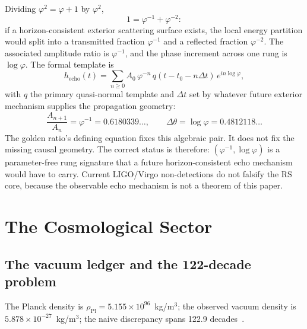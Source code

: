 \documentclass[11pt,letterpaper]{article}
\theoremstyle{definition}
\newcommand{\phiG}{\varphi}
\newcommand{\Pl}{\mathrm{Pl}}
\begin{document}
Dividing $\phiG^2=\phiG+1$ by $\phiG^2$,
\begin{equation}\label{eq:partition}
1=\phiG^{-1}+\phiG^{-2}:
\end{equation}
if a horizon-consistent exterior scattering surface exists, the local
energy partition would split into a transmitted fraction $\phiG^{-1}$
and a reflected fraction $\phiG^{-2}$.  The associated amplitude ratio
is $\phiG^{-1}$, and the phase increment across one rung is
$\log\phiG$.  The formal template is
\begin{equation}\label{eq:echo}
h_{\mathrm{echo}}(t)=\sum_{n\ge0}A_0\,\phiG^{-n}\,
q(t-t_0-n\Delta t)\,e^{in\log\phiG},
\end{equation}
with $q$ the primary quasi-normal template and $\Delta t$ set by whatever
future exterior mechanism supplies the propagation geometry:
\begin{equation}
\frac{A_{n+1}}{A_n}=\phiG^{-1}=0.6180339\ldots,
\qquad
\Delta\theta=\log\phiG=0.4812118\ldots
\end{equation}
The golden ratio's defining equation fixes this algebraic pair.  It
does not fix the missing causal geometry.  The correct status is
therefore: $(\phiG^{-1},\log\phiG)$ is a parameter-free rung signature
that a future horizon-consistent echo mechanism would have to carry.
Current LIGO/Virgo non-detections do not falsify the RS core, because
the observable echo mechanism is not a theorem of this paper.

\section{The Cosmological Sector}
\label{sec:cosmo}

\subsection{The vacuum ledger and the 122-decade problem}
\label{sec:vacuum}

The Planck density is $\rho_\Pl=5.155\times10^{96}$~kg/m$^3$; the
observed vacuum density is $5.878\times10^{-27}$~kg/m$^3$; the naive
discrepancy spans 122.9 decades~\cite{Weinberg1989}.
\end{document}
